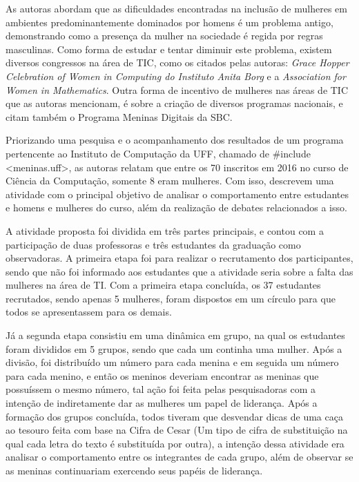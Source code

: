 As autoras abordam que as dificuldades encontradas na inclusão de mulheres em ambientes predominantemente dominados por homens é um problema antigo, demonstrando como a presença da mulher na sociedade é regida por regras masculinas. Como forma de estudar e tentar diminuir este problema, existem diversos congressos na área de TIC, como os citados pelas autoras: \textit{Grace Hopper Celebration of Women in Computing do Instituto Anita Borg} e a \textit{Association for Women in Mathematics}. Outra forma de incentivo de mulheres nas áreas de TIC que as autoras mencionam, é sobre a criação de diversos programas nacionais, e citam também o Programa Meninas Digitais da SBC.

Priorizando uma pesquisa e o acompanhamento dos resultados de um programa pertencente ao Instituto de Computação da UFF, chamado de \#include <meninas.uff>, as autoras relatam que entre os 70 inscritos em 2016 no curso de Ciência da Computação, somente 8 eram mulheres. Com isso, descrevem uma atividade com o principal objetivo de analisar o comportamento entre estudantes e homens e mulheres do curso, além da realização de debates relacionados a isso.


A atividade proposta foi dividida em três partes principais, e contou com a participação de duas professoras e três estudantes da graduação como observadoras. A primeira etapa foi para realizar o recrutamento dos participantes, sendo que não foi informado aos estudantes que a atividade seria sobre a falta das mulheres na área de TI. Com a primeira etapa concluída, os 37 estudantes recrutados, sendo apenas 5 mulheres, foram dispostos em um círculo para que todos se apresentassem para os demais. 

Já a segunda etapa consistiu em uma dinâmica em grupo, na qual os estudantes foram divididos em 5 grupos, sendo que cada um continha uma mulher. Após a divisão, foi distribuído um número para cada menina e em seguida um número para cada menino, e então os meninos deveriam encontrar as meninas que possuíssem o mesmo número, tal ação foi feita pelas pesquisadoras com a intenção de indiretamente dar as mulheres um papel de liderança. Após a formação dos grupos concluída, todos tiveram que desvendar dicas de uma caça ao tesouro feita com base na Cifra de Cesar (Um tipo de cifra de substituição na qual cada letra do texto é substituída por outra), a intenção dessa atividade era analisar o comportamento entre os integrantes de cada grupo, além de observar se as meninas continuariam exercendo seus papéis de liderança.

